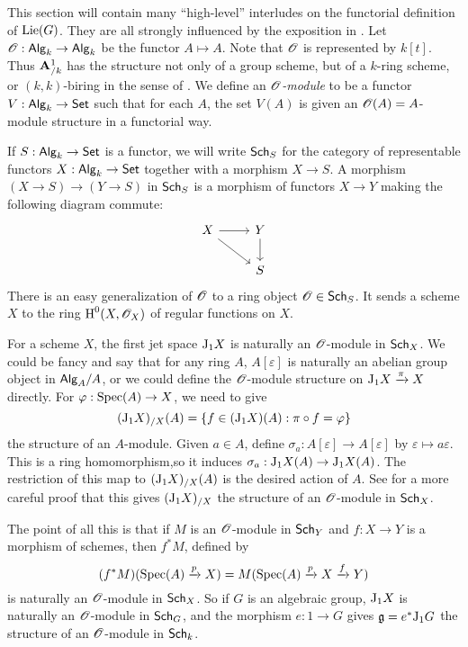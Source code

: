 \begin{hard}
This section will contain many ``high-level'' interludes on the functorial 
definition of $\operatorname{Lie}(G)$. They are all strongly influenced by the exposition in 
\cite[II \S3--4]{sga3-i}. Let $\mathscr{O}:\mathsf{Alg}_{k}\to \mathsf{Alg}_{k}$ be the functor 
$A\mapsto A$. Note that $\mathscr{O}$ is represented by $k[t]$. Thus $\mathbf{A}^1_{/k}$ has 
the structure not only of a group scheme, but of a $k$-ring scheme, or 
$(k,k)$-biring in the sense of \cite{borger-wieland-2005}. We define an 
\emph{$\mathscr{O}$-module} to be a functor $V:\mathsf{Alg}_{k}\to \mathsf{Set}$ such that for each 
$A$, the set $V(A)$ is given an $\mathscr{O}(A)=A$-module structure in a functorial 
way. 

If $S:\mathsf{Alg}_{k} \to \mathsf{Set}$ is a functor, we will write 
$\mathsf{Sch}_{S}$ for the category of representable functors 
$X:\mathsf{Alg}_{k}\to \mathsf{Set}$ together with a morphism $X\to S$. A morphism 
$(X\to S)\to (Y\to S)$ in $\mathsf{Sch}_{S}$ is a morphism of functors 
$X\to Y$ making the following diagram commute:
\[\begin{tikzcd}
  X \ar[r] \ar[dr] 
    & Y \ar[d] \\
  & S 
\end{tikzcd}\]
There is an easy generalization of $\mathscr{O}$ to a ring object 
$\mathscr{O}\in\mathsf{Sch}_{S}$. It sends a scheme $X$ to the ring $\operatorname{H}^0(X,\mathscr{O}_X)$ of 
regular functions on $X$. 

For a scheme $X$, the first jet space 
$\mathrm{J}_1 X$ is naturally an $\mathscr{O}$-module in $\mathsf{Sch}_{X}$. We could be fancy and 
say that for any ring $A$, $A[\varepsilon]$ is naturally an abelian group 
object in $\mathsf{Alg}_{A}/A$, or we could define the $\mathscr{O}$-module structure on 
$\mathrm{J}_1 X\xrightarrow\pi X$ directly. For $\varphi:\operatorname{Spec}(A)\to X$, we need 
to give 
\[
  (\mathrm{J}_1 X)_{/X}(A) = \{f\in (\mathrm{J}_1 X)(A):\pi\circ f = \varphi\} 
\]
the structure of an $A$-module. Given $a\in A$, define 
$\sigma_a:A[\varepsilon]\to A[\varepsilon]$ by 
$\varepsilon\mapsto a\varepsilon$. This is a ring homomorphism,so it induces 
$\sigma_a:\mathrm{J}_1 X(A)\to \mathrm{J}_1 X(A)$. The restriction of this map to 
$(\mathrm{J}_1 X)_{/X}(A)$ is the desired action of $A$. See \cite[II 3.4.1]{sga3-i} 
for a more careful proof that this gives $(\mathrm{J}_1 X)_{/X}$ the structure of 
an $\mathscr{O}$-module in $\mathsf{Sch}_{X}$. 

The point of all this is that if $M$ is an $\mathscr{O}$-module in 
$\mathsf{Sch}_{Y}$ and $f:X\to Y$ is a morphism of schemes, then 
$f^\ast M$, defined by 
\[
  (f^\ast M)(\operatorname{Spec}(A)\xrightarrow p X) = M(\operatorname{Spec}(A)\xrightarrow p X\xrightarrow f Y)
\]
is naturally an $\mathscr{O}$-module in $\mathsf{Sch}_{X}$. So if $G$ is an algebraic group, 
$\mathrm{J}_1 X$ is naturally an $\mathscr{O}$-module in $\mathsf{Sch}_{G}$, and the morphism 
$e:1\to G$ gives $\mathfrak{g}=e^\ast \mathrm{J}_1 G$ the structure of an $\mathscr{O}$-module in 
$\mathsf{Sch}_{k}$. 
\end{hard}

